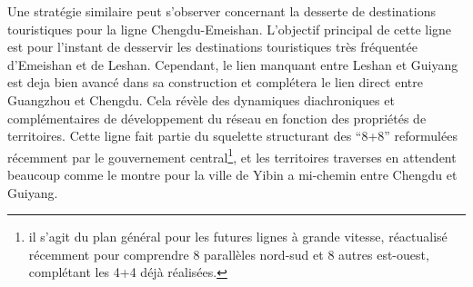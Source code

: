 {
Une stratégie similaire peut s'observer concernant la desserte de destinations touristiques pour la ligne Chengdu-Emeishan. L'objectif principal de cette ligne est pour l'instant de desservir les destinations touristiques très fréquentée d'Emeishan et de Leshan. Cependant, le lien manquant entre Leshan et Guiyang est deja bien avancé dans sa construction et complétera le lien direct entre Guangzhou et Chengdu. Cela révèle des dynamiques diachroniques et complémentaires de développement du réseau en fonction des propriétés de territoires. Cette ligne fait partie du squelette structurant des ``8+8'' reformulées récemment par le gouvernement central\footnote{il s'agit du plan général pour les futures lignes à grande vitesse, réactualisé récemment pour comprendre 8 parallèles nord-sud et 8 autres est-ouest, complétant les 4+4 déjà réalisées.}, et les territoires traverses en attendent beaucoup comme le montre \cite{lu2012chengdu} pour la ville de Yibin a mi-chemin entre Chengdu et Guiyang.
}


